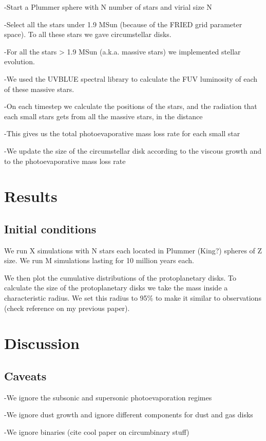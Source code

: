 \documentclass[fleqn,usenatbib]{mnras}
\begin{document}
-Start a Plummer sphere with N number of stars and virial size N

-Select all the stars under 1.9 MSun (because of the FRIED grid parameter space). To all these stars we gave circumstellar disks.

-For all the stars > 1.9 MSun (a.k.a. massive stars) we implemented stellar evolution.

-We used the UVBLUE spectral library to calculate the FUV luminosity of each of these massive stars.

-On each timestep we calculate the positions of the stars, and the radiation that each small stars gets from all the massive stars, in the distance

-This gives us the total photoevaporative mass loss rate for each small star

-We update the size of the circumstellar disk according to the viscous growth and to the photoevaporative mass loss rate

\section{Results}
\label{sec:results}

\subsection{Initial conditions}
We run X simulations with N stars each located in Plummer (King?) spheres of Z size. We run M simulations lasting for 10 million years each. 

We then plot the cumulative distributions of the protoplanetary disks. To calculate the size of the protoplanetary disks we take the mass inside a characteristic radius. We set this radius to 95\% to make it similar to observations (check reference on my previous paper).

\section{Discussion}
\label{sec:discussion}

\subsection{Caveats}
-We ignore the subsonic and supersonic photoevaporation regimes 

-We ignore dust growth and ignore different components for dust and gas disks 

-We ignore binaries (cite cool paper on circumbinary stuff)
\end{document}
